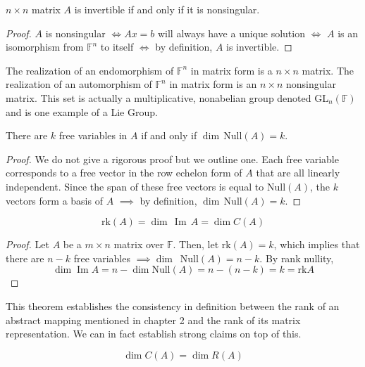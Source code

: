 \documentclass{article}
\DeclareMathOperator{\im}{Im}
\begin{document}
    \begin{theorem}
    $n \times n$ matrix $A$ is invertible if and only if it is nonsingular. 
    \end{theorem}
    \begin{proof}
    $A$ is nonsingular $\iff A x = b$ will always have a unique solution $\iff$ $A$ is an isomorphism from $\mathbb{F}^n$ to itself $\iff$ by definition, $A$ is invertible. 
    \end{proof}

    The realization of an endomorphism of $\mathbb{F}^n$ in matrix form is a $n \times n$ matrix. The realization of an automorphism of $\mathbb{F}^n$ in matrix form is an $n \times n$ nonsingular matrix. This set is actually a multiplicative, nonabelian group denoted GL$_n(\mathbb{F})$ and is one example of a Lie Group. 

    \begin{proposition}
    There are $k$ free variables in $A$ if and only if $\dim\,$Null$(A) = k$. 
    \end{proposition}
    \begin{proof}
    We do not give a rigorous proof but we outline one. Each free variable corresponds to a free vector in the row echelon form of $A$ that are all linearly independent. Since the span of these free vectors is equal to Null$(A)$, the $k$ vectors form a basis of $A$ $\implies$ by definition, $\dim\,$Null$(A) = k$.
    \end{proof}

    \begin{theorem}
    \[\text{rk}(A) = \dim \, \im \,A = \dim C(A)\]
    \end{theorem}

    \begin{proof}
    Let $A$ be a $m \times n$ matrix over $\mathbb{F}$. Then, let rk$(A) = k$, which implies that there are $n-k$ free variables $\implies \dim \,$ Null$(A) = n - k$. By rank nullity, 
    \[\dim \im{A} = n - \dim \text{Null}(A) = n - (n -k) = k = \text{rk} A \]
    \end{proof}

    This theorem establishes the consistency in definition between the rank of an abstract mapping mentioned in chapter 2 and the rank of its matrix representation. We can in fact establish strong claims on top of this. 

    \begin{theorem} 
    \[\dim C(A) = \dim R(A)\]
    \end{theorem}
\end{document}
